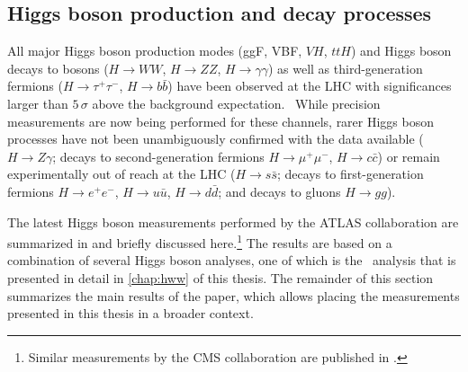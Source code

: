 \subsection{Higgs boson production and decay processes}
All major Higgs boson production modes (ggF, VBF, $VH$, $ttH$) and Higgs boson decays to bosons ($H \to WW$, $H \to ZZ$, $H \to \gamma\gamma$) as well as third-generation fermions ($H \to \tau^+\tau^-$, $H \to b\bar{b}$) have been observed at the LHC with significances larger than $5\,\sigma$ above the background expectation.~\cite{NaturePaper}
While precision measurements are now being performed for these channels, rarer Higgs boson processes have not been unambiguously confirmed with the data available ($H \to Z\gamma$; decays to second-generation fermions $H \to \mu^+\mu^-$, $H \to c\bar{c}$) or remain experimentally out of reach at the LHC ($H \to s\bar{s}$; decays to first-generation fermions $H \to e^+e^-$, $H \to u\bar{u}$, $H \to d\bar{d}$; and decays to gluons $H \to gg$).

The latest Higgs boson measurements performed by the ATLAS collaboration are summarized in  and briefly discussed here.\footnote{Similar measurements by the CMS collaboration are published in .}
The results are based on a combination of several Higgs boson analyses, one of which is the \HWW\ analysis that is presented in detail in \cref{chap:hww} of this thesis. 
The remainder of this section summarizes the main results of the paper, which allows placing the measurements presented in this thesis in a broader context. 


